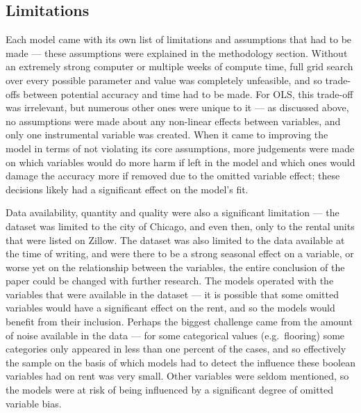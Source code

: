 \documentclass[12pt]{report}
\begin{document}
\subsection{Limitations}
Each model came with its own list of limitations and assumptions that had to be made --- these assumptions were explained in the methodology section. Without an extremely strong computer or multiple weeks of compute time, full grid search over every possible parameter and value was completely unfeasible, and so trade-offs between potential accuracy and time had to be made. For OLS, this trade-off was irrelevant, but numerous other ones were unique to it --- as discussed above, no assumptions were made about any non-linear effects between variables, and only one instrumental variable was created. When it came to improving the model in terms of not violating its core assumptions, more judgements were made on which variables would do more harm if left in the model and which ones would damage the accuracy more if removed due to the omitted variable effect; these decisions likely had a significant effect on the model's fit.

Data availability, quantity and quality were also a significant limitation --- the dataset was limited to the city of Chicago, and even then, only to the rental units that were listed on Zillow. The dataset was also limited to the data available at the time of writing, and were there to be a strong seasonal effect on a variable, or worse yet on the relationship between the variables, the entire conclusion of the paper could be changed with further research. The models operated with the variables that were available in the dataset --- it is possible that some omitted variables would have a significant effect on the rent, and so the models would benefit from their inclusion. Perhaps the biggest challenge came from the amount of noise available in the data --- for some categorical values (e.g.\ flooring) some categories only appeared in less than one percent of the cases, and so effectively the sample on the basis of which models had to detect the influence these boolean variables had on rent was very small. Other variables were seldom mentioned, so the models were at risk of being influenced by a significant degree of omitted variable bias.
\end{document}
